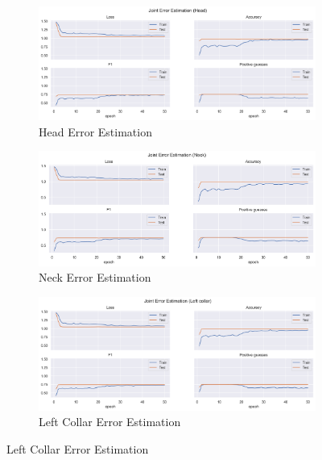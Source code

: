 \begin{figure}[!htbp]
    \centering
    \begin{subfigure}[b]{0.47\linewidth}
        \centering
        \includegraphics[width=\textwidth]{figures/Results/v2/jt/Head_ErrorEstimation.png}
        \caption{Head Error Estimation}
        \label{fig:v2_head_jt_ee}
    \end{subfigure}
    \hfill
    \begin{subfigure}[b]{0.47\linewidth}
        \centering
        \includegraphics[width=\textwidth]{figures/Results/v2/jt/Neck_ErrorEstimation.png}
        \caption{Neck Error Estimation}
        \label{fig:v2_neck_jt_ee}
    \end{subfigure}
    \hfill
    \begin{subfigure}[b]{0.47\linewidth}
        \centering
        \includegraphics[width=\textwidth]{figures/Results/v2/jt/Left collar_ErrorEstimation.png}
        \caption{Left Collar Error Estimation}

\end{subfigure}
\end{figure}
